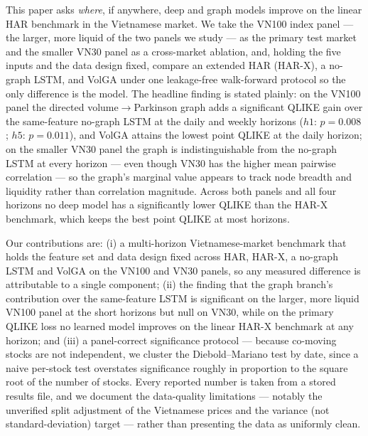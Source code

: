\documentclass[runningheads]{llncs}
\begin{document}
This paper asks \emph{where}, if anywhere, deep and graph models improve on the linear HAR
benchmark in the Vietnamese market. We take the VN100 index panel --- the larger, more liquid of the
two panels we study --- as the primary test market and the smaller VN30 panel as a cross-market
ablation, and, holding the five inputs and the data design fixed, compare an extended HAR (HAR-X), a
no-graph LSTM, and VolGA under one leakage-free walk-forward protocol so the only difference is the
model. The headline finding is stated plainly: on the VN100 panel the directed
volume$\to$Parkinson graph adds a significant QLIKE gain over the same-feature no-graph LSTM at the
daily and weekly horizons ($h1$: $p=0.008$; $h5$: $p=0.011$), and VolGA attains the lowest point
QLIKE at the daily horizon; on the smaller VN30 panel the graph is indistinguishable from the
no-graph LSTM at every horizon --- even though VN30 has the higher mean pairwise correlation --- so
the graph's marginal value appears to track node breadth and liquidity rather than correlation
magnitude. Across both panels and all four horizons no deep model has a significantly lower QLIKE
than the HAR-X benchmark, which keeps the best point QLIKE at most horizons.

Our contributions are: (i) a multi-horizon Vietnamese-market benchmark that holds the feature set
and data design fixed across HAR, HAR-X, a no-graph LSTM and VolGA on the VN100 and VN30 panels, so
any measured difference is attributable to a single component; (ii) the finding that the graph
branch's contribution over the same-feature LSTM is significant on the larger, more liquid VN100
panel at the short horizons but null on VN30, while on the primary QLIKE loss no learned model
improves on the linear HAR-X benchmark at any horizon; and (iii) a panel-correct significance
protocol --- because co-moving stocks are not independent, we cluster the Diebold--Mariano test by
date, since a naive per-stock test overstates significance roughly in proportion to the square root
of the number of stocks. Every reported number is taken from a stored results file, and we document
the data-quality limitations --- notably the unverified split adjustment of the Vietnamese prices and
the variance (not standard-deviation) target --- rather than presenting the data as uniformly clean.
\end{document}
